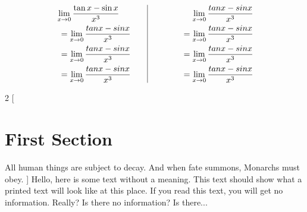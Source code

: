 \documentclass[14pt]{extarticle}
\begin{document}
\begin{equation*}
\begin{aligned}[t]
&\lim_{x \to 0} \frac{\tan{x} - \sin{x}}{x^3} \\
&\ =\lim_{x \to 0} \frac{tan x - sin x}{x^3}\\ 
&\ =\lim_{x \to 0} \frac{tan x - sin x}{x^3} \\
&\ =\lim_{x \to 0} \frac{tan x - sin x}{x^3} 
\end{aligned}
\qquad
\vrule 
\qquad
\begin{aligned}[t]
\end{aligned}
\qquad
\begin{aligned}[t]
\lim_{x \to 0} \frac{tan x - sin x}{x^3} \\
\ =\lim_{x \to 0} \frac{tan x - sin x}{x^3}\\ 
\ =\lim_{x \to 0} \frac{tan x - sin x}{x^3} \\
\ =\lim_{x \to 0} \frac{tan x - sin x}{x^3} 
\end{aligned}
\end{equation*}

\begin{multicols}{2}
[
\section{First Section}
All human things are subject to decay. And when fate summons, Monarchs must obey.
]
Hello, here is some text without a meaning.  This text should show what 
a printed text will look like at this place.
If you read this text, you will get no information.  Really?  Is there 
no information?  Is there...
\end{multicols}
\end{document}
